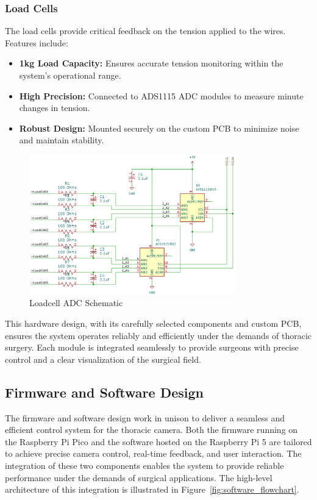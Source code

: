 \subsubsection{Load Cells}
The load cells provide critical feedback on the tension applied to the wires. Features include:
\begin{itemize}
    \item \textbf{1kg Load Capacity:} Ensures accurate tension monitoring within the system's operational range.
    \item \textbf{High Precision:} Connected to ADS1115 ADC modules to measure minute changes in tension.
    \item \textbf{Robust Design:} Mounted securely on the custom PCB to minimize noise and maintain stability.
\end{itemize}

\begin{figure}[H]
    \centering
    \includegraphics[width=0.8\textwidth]{images/ADC.png}
    \caption{Loadcell ADC Schematic}
    \label{fig:ADC}
\end{figure}


This hardware design, with its carefully selected components and custom PCB, ensures the system operates reliably and efficiently under the demands of thoracic surgery. Each module is integrated seamlessly to provide surgeons with precise control and a clear visualization of the surgical field.

\newpage
\subsection{Firmware and Software Design}

The firmware and software design work in unison to deliver a seamless and efficient control system for the thoracic camera. Both the firmware running on the Raspberry Pi Pico and the software hosted on the Raspberry Pi 5 are tailored to achieve precise camera control, real-time feedback, and user interaction. The integration of these two components enables the system to provide reliable performance under the demands of surgical applications. The high-level architecture of this integration is illustrated in Figure~\ref{fig:software_flowchart}.

